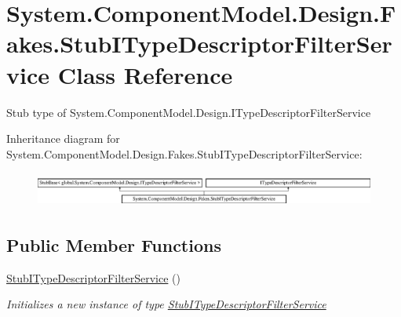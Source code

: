 \hypertarget{class_system_1_1_component_model_1_1_design_1_1_fakes_1_1_stub_i_type_descriptor_filter_service}{\section{System.\-Component\-Model.\-Design.\-Fakes.\-Stub\-I\-Type\-Descriptor\-Filter\-Service Class Reference}
\label{class_system_1_1_component_model_1_1_design_1_1_fakes_1_1_stub_i_type_descriptor_filter_service}
}


Stub type of System.\-Component\-Model.\-Design.\-I\-Type\-Descriptor\-Filter\-Service 


Inheritance diagram for System.\-Component\-Model.\-Design.\-Fakes.\-Stub\-I\-Type\-Descriptor\-Filter\-Service\-:\begin{figure}[H]
\begin{center}
\leavevmode
\includegraphics[height=1.149897cm]{class_system_1_1_component_model_1_1_design_1_1_fakes_1_1_stub_i_type_descriptor_filter_service}
\end{center}
\end{figure}
\subsection*{Public Member Functions}
\begin{DoxyCompactItemize}
\item 
\hyperlink{class_system_1_1_component_model_1_1_design_1_1_fakes_1_1_stub_i_type_descriptor_filter_service_a9d59d8a35935233024cc9ad3a30229e4}{Stub\-I\-Type\-Descriptor\-Filter\-Service} ()
\begin{DoxyCompactList}\small\item\em Initializes a new instance of type \hyperlink{class_system_1_1_component_model_1_1_design_1_1_fakes_1_1_stub_i_type_descriptor_filter_service}{Stub\-I\-Type\-Descriptor\-Filter\-Service}\end{DoxyCompactList}\end{DoxyCompactItemize}
